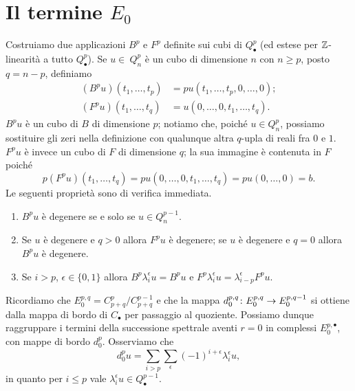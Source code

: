 \section{Il termine \texorpdfstring{$E_0$}{E0}}
Costruiamo due applicazioni $B^p$ e $F^p$ definite sui cubi di $Q^p_\bullet$ (ed estese per $\mathbb{Z}$-linearità a tutto $Q^p_\bullet$). Se $u\in\ Q^p_n$ è un cubo di dimensione $n$ con $n\ge p$, posto $q=n-p$, definiamo
\begin{align*}
(B^pu)(t_1,\ldots,t_p)&=pu(t_1,\ldots,t_p,0,\ldots,0);\\
(F^pu)(t_1,\ldots,t_q)&=u(0,\ldots,0,t_1,\ldots,t_q).
\end{align*}
$B^pu$ è un cubo di $B$ di dimensione $p$; notiamo che, poiché $u\in Q^p_n$, possiamo sostituire gli zeri nella definizione con qualunque altra $q$-upla di reali fra $0$ e $1$. $F^pu$ è invece un cubo di $F$ di dimensione $q$; la sua immagine è contenuta in $F$ poiché
$$
p(F^pu)(t_1,\ldots,t_q)=pu(0,\ldots,0,t_1,\ldots,t_q)=pu(0,\ldots,0)=b.
$$
Le seguenti proprietà sono di verifica immediata.
\begin{enumerate}
\item\label{spectral-sequence-of-fibration:pr1} $B^pu$ è degenere se e solo se $u\in Q^{p-1}_n$.
\item\label{spectral-sequence-of-fibration:pr2} Se $u$ è degenere e $q>0$ allora $F^pu$ è degenere; se $u$ è degenere e $q=0$ allora $B^pu$ è degenere.
\item\label{spectral-sequence-of-fibration:pr3} Se $i>p$, $\epsilon\in\{0,1\}$ allora $B^p\lambda^\epsilon_iu=B^pu$ e $F^p\lambda^\epsilon_iu=\lambda^\epsilon_{i-p}F^pu$.
\end{enumerate}

Ricordiamo che $E^{p,q}_0=C^p_{p+q}/C^{p-1}_{p+q}$ e che la mappa $d^{p,q}_0\colon E^{p,q}_0\to E^{p,q-1}_0$ si ottiene dalla mappa di bordo di $C_\bullet$ per passaggio al quoziente. Possiamo dunque raggruppare i termini della successione spettrale aventi $r=0$ in complessi $E^{p,\bullet}_0$, con mappe di bordo $d^p_0$. Osserviamo che
$$
d^p_0u=\sum_{i>p}\sum_\epsilon(-1)^{i+\epsilon}\lambda^\epsilon_iu,
$$
in quanto per $i\le p$ vale $\lambda^\epsilon_iu\in Q^{p-1}_\bullet$.

